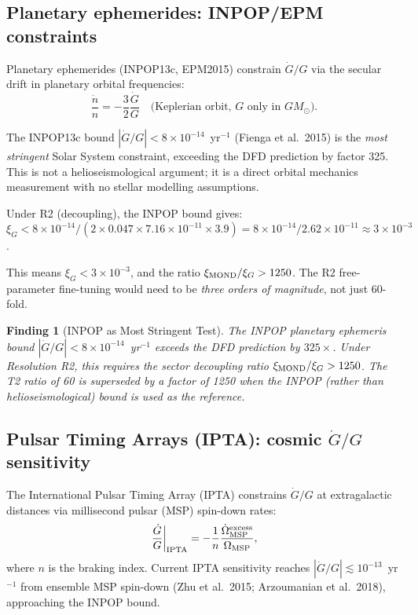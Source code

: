 \documentclass[aps,prd,twocolumn,superscriptaddress,nofootinbib,longbibliography]{revtex4-2}
\newcommand{\ee}[1]{\times 10^{#1}}
\newtheorem{finding}{Finding}
\begin{document}
\subsection{Planetary ephemerides: INPOP/EPM constraints}

Planetary ephemerides (INPOP13c, EPM2015) constrain $\dot{G}/G$ via the
secular drift in planetary orbital frequencies:
\begin{equation}
\frac{\dot{n}}{n} = -\frac{3}{2}\frac{\dot{G}}{G}
\quad\text{(Keplerian orbit, $G$ only in $GM_\odot$)}.
\label{eq:ephemeris-Gdot}
\end{equation}

The INPOP13c bound $|\dot{G}/G| < 8\ee{-14}$~yr$^{-1}$ (Fienga et al.\ 2015)
is the \emph{most stringent} Solar System constraint, exceeding the DFD
prediction by factor 325.  This is not a helioseismological argument; it is
a direct orbital mechanics measurement with no stellar modelling assumptions.

Under R2 (decoupling), the INPOP bound gives:
$\xi_G < 8\ee{-14}/(2\times 0.047\times 7.16\ee{-11}\times 3.9) = 8\ee{-14}/2.62\ee{-11}
\approx 3\ee{-3}$.

This means $\xi_G < 3\ee{-3}$, and the ratio $\xi_{\rm MOND}/\xi_G > 1250$.
The R2 free-parameter fine-tuning would need to be \emph{three orders of
magnitude}, not just 60-fold.

\begin{finding}[INPOP as Most Stringent Test]
The INPOP planetary ephemeris bound $|\dot{G}/G| < 8\ee{-14}$~yr$^{-1}$
exceeds the DFD prediction by $325\times$.  Under Resolution R2, this
requires the sector decoupling ratio $\xi_{\rm MOND}/\xi_G > 1250$.
The T2 ratio of 60 is superseded by a factor of 1250 when the INPOP
(rather than helioseismological) bound is used as the reference.
\end{finding}

\subsection{Pulsar Timing Arrays (IPTA): cosmic $\dot{G}/G$ sensitivity}

The International Pulsar Timing Array (IPTA) constrains $\dot{G}/G$ at
extragalactic distances via millisecond pulsar (MSP) spin-down rates:
\begin{equation}
\left.\frac{\dot{G}}{G}\right|_{\rm IPTA} =
-\frac{1}{n}\frac{\dot{\Omega}_{\rm MSP}^{\rm excess}}{\Omega_{\rm MSP}},
\label{eq:IPTA-Gdot}
\end{equation}
where $n$ is the braking index.  Current IPTA sensitivity reaches
$|\dot{G}/G| \lesssim 10^{-13}$~yr$^{-1}$ from ensemble MSP spin-down
(Zhu et al.\ 2015; Arzoumanian et al.\ 2018), approaching the INPOP bound.
\end{document}
